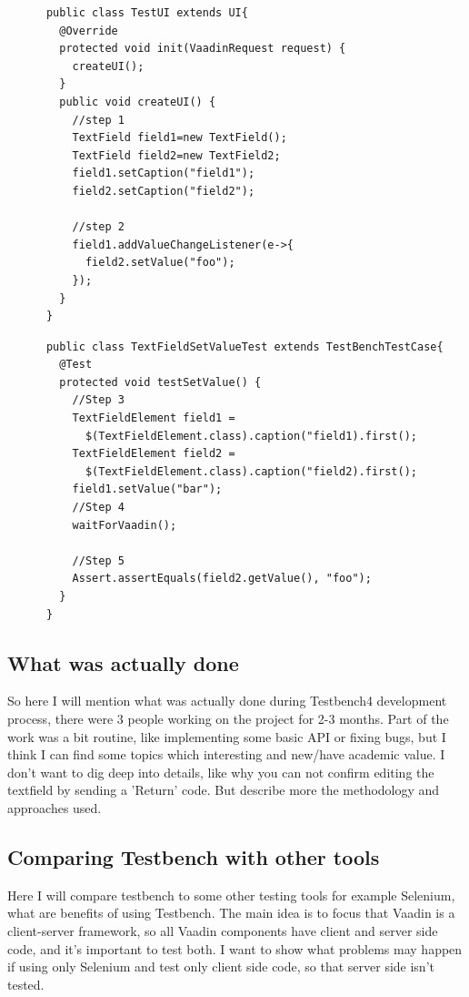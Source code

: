 \documentclass{article}
\begin{document}
  
    \lstset{language=Java}
    \begin{lstlisting}
      public class TestUI extends UI{
        @Override
        protected void init(VaadinRequest request) {
          createUI();
        }
        public void createUI() {
          //step 1 
          TextField field1=new TextField();
          TextField field2=new TextField2;
          field1.setCaption("field1");
          field2.setCaption("field2");
          
          //step 2
          field1.addValueChangeListener(e->{
            field2.setValue("foo");
          });
        }
      }
    \end{lstlisting}  
    
    \lstset{language=Java}
    \begin{lstlisting}
      public class TextFieldSetValueTest extends TestBenchTestCase{
        @Test
        protected void testSetValue() {
          //Step 3
          TextFieldElement field1 =
            $(TextFieldElement.class).caption("field1).first();
          TextFieldElement field2 =
            $(TextFieldElement.class).caption("field2).first();  
          field1.setValue("bar");
          //Step 4
          waitForVaadin();
          
          //Step 5
          Assert.assertEquals(field2.getValue(), "foo");           
        }
      }
    \end{lstlisting}  
     \subsection {What was actually done}
      So here I will mention what was actually done during Testbench4
      development process, there were 3 people working on the project for 2-3
      months. Part of the work was a bit routine, like implementing some basic
      API or fixing bugs, but I think I can find some topics which interesting
      and new/have academic value. I don't want to dig deep into details, like
      why you can not confirm editing the textfield by sending a 'Return' code.
      But describe more the methodology and approaches used.
      
   \subsection {Comparing Testbench with other tools}
    Here I will compare testbench to some other testing tools for example
    Selenium, what are benefits of using Testbench. The main idea is to focus
    that Vaadin is a client-server framework, so all Vaadin components have
    client and server side code, and it's important to test both. I want to show
    what problems may happen if using only Selenium and test only client side
    code, so that server side isn't tested. 
    
\end{document}
